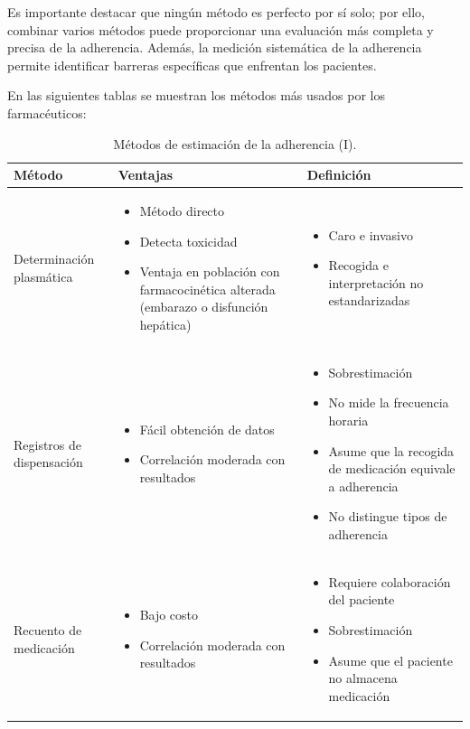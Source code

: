 Es importante destacar que ningún método es perfecto por sí solo; por ello, combinar varios métodos puede proporcionar una evaluación más completa y precisa de la adherencia. Además, la medición sistemática de la adherencia permite identificar barreras específicas que enfrentan los pacientes. \cite{ibarra2017adherencia}\\
  
\newpage

En las siguientes tablas se muestran los métodos más usados por los farmacéuticos: \\

\begin{table}[ht]
	\centering
	\label{my-label}
	\begin{tabular}{|p{4cm}|p{5.5cm}|p{5.5cm}|}
		\hline
		\textbf{Método} & \textbf{Ventajas} & \textbf{Definición} \\ \hline
		Determinación plasmática & 
		\begin{itemize}
			\item Método directo
			\item Detecta toxicidad
			\item Ventaja en población con farmacocinética alterada (embarazo o disfunción hepática)
		\end{itemize} & 
		\begin{itemize}
			\item Caro e invasivo
			\item Recogida e interpretación no estandarizadas
		\end{itemize} \\ \hline
		Registros de dispensación & 
		\begin{itemize}
			\item Fácil obtención de datos
			\item Correlación moderada con resultados
		\end{itemize} & 
		\begin{itemize}
			\item Sobrestimación
			\item No mide la frecuencia horaria
			\item Asume que la recogida de medicación equivale a adherencia
			\item No distingue tipos de adherencia
		\end{itemize} \\ \hline
		Recuento de medicación & 
		\begin{itemize}
			\item Bajo costo
			\item Correlación moderada con resultados
		\end{itemize} & 
		\begin{itemize}
			\item Requiere colaboración del paciente
			\item Sobrestimación
			\item Asume que el paciente no almacena medicación
		\end{itemize} \\ \hline
	\end{tabular}

\caption{Métodos de estimación de la adherencia (I).}
\end{table}

